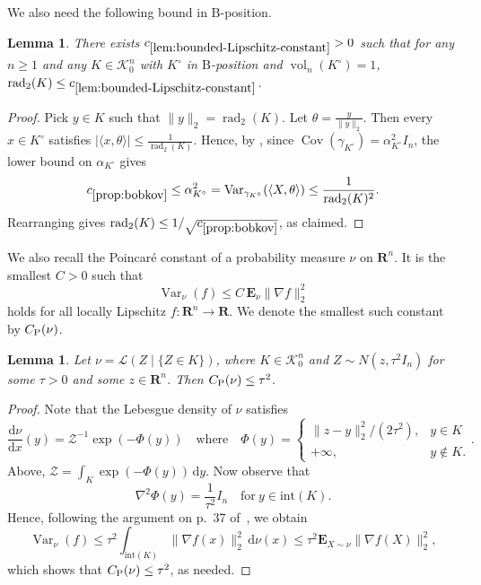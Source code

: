 \documentclass[11pt]{amsart}
\newcommand{\R}{\mathbf R}
\newcommand{\E}{\mathbf E}
\newcommand{\Vol}{\operatorname{vol}}
\newcommand{\rad}{\operatorname{rad}_2}
\newcommand{\Cov}{\operatorname{Cov}}
\newcommand{\Var}{\operatorname{Var}}
\newcommand{\1}{\mathbf 1}
\newcommand{\ud}{\mathrm{d}}
\newcommand{\PoinConst}{C_{\rm P}}
\newcommand{\Bodies}{\mathcal{K}_0^n}
\newcommand{\Bobkov}{\mathrm{B}}
\newcommand{\cL}{\mathcal{L}}
\let\vol\Vol
\theoremstyle{plain}
\newtheorem{lemma}[theorem]{Lemma}
\begin{document}
We also need the following bound in $\Bobkov$-position.
\begin{lemma}
\label{lem:bounded-Lipschitz-constant}
There exists $c_{\ref{lem:bounded-Lipschitz-constant}} > 0$ such that for any $n \geq 1$ and any $K \in \Bodies$ with $K^\circ$ in $\Bobkov$-position and $\vol_n(K^\circ) = 1$, $\rad(K) \leq c_{\ref{lem:bounded-Lipschitz-constant}}$.
\end{lemma}
\begin{proof}
Pick $y \in K$ such that $\|y\|_2 = \rad(K)$. Let $\theta = \tfrac{y}{\|y\|_2}$. Then every $x \in K^\circ$ satisfies $|\langle x, \theta \rangle | \leq \tfrac{1}{\rad(K)}$.
Hence, by , since $\Cov(\gamma_{K^\circ}) = \alpha_{K^\circ}^2 I_n$, the lower bound on $\alpha_{K^\circ}$ gives
\[
c_{\ref{prop:bobkov}} \leq \alpha_{K^\circ}^2 = \Var_{\gamma_{K^\circ}}(\langle X, \theta\rangle) \leq \frac{1}{\rad(K)^2}.
\]
Rearranging gives $\rad(K) \leq 1/\sqrt{c_{\ref{prop:bobkov}}}$, as claimed.
\end{proof}




We also recall the Poincar\'{e} constant of a probability measure $\nu$ on $\R^n$. It is the smallest $C > 0$ such that 
\[
\Var_\nu(f) \leq C\, \E_\nu \|\nabla f\|_2^2 
\]
holds for all locally Lipschitz $f \colon \R^n \to \R$. We denote the smallest such constant by $\PoinConst(\nu)$. 


\begin{lemma}
\label{lem:poin-const-of-conditioned-gaussians}
Let $\nu = \cL(Z \mid \{Z \in K\})$, where $K \in \Bodies$ and $Z \sim N(z, \tau^2 I_n)$ for some $\tau > 0$ and some $z  \in \R^n$. Then $\PoinConst(\nu) \leq \tau^2$. 
\end{lemma}
\begin{proof}
Note that the Lebesgue density of $\nu$ satisfies
\[
\frac{\ud \nu}{\ud x}(y) = 
\mathcal{Z}^{-1}\exp(-\Phi(y)) \quad
\mbox{where}
\quad \Phi(y) = \begin{cases} 
\|z-y\|_2^2/(2\tau^2), & y \in K \\ 
+\infty,& y \not \in K. 
\end{cases}.
\]
Above, $\mathcal{Z} = \int_K \exp(-\Phi(y)) \, \ud y$. Now observe that
\[
\nabla^2 \Phi(y) = \frac{1}{\tau^2} I_n \quad \mbox{for}~y \in \mathrm{int}(K).
\]
Hence, following the argument on p.~37 of~\cite{BarCorEra13}, we obtain 
\[
\Var_\nu(f) \leq \tau^2 \int_{\mathrm{int}(K)} \|\nabla f(x)\|_2^2 \, \ud \nu(x) \leq \tau^2 \E_{X \sim \nu} \|\nabla f(X)\|_2^2,
\]
which shows that $\PoinConst(\nu) \leq \tau^2$, as needed.
\end{proof}
\end{document}
